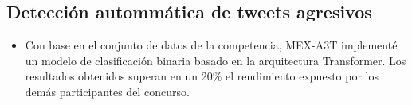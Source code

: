 \documentclass[a3paper]{adcv_color}
\begin{document}
\begin{addmargin}[0.5em]{0.5em}
	\subsection{Detección autommática de tweets agresivos}
	\begin{itemize}
		\item Con base en el conjunto de datos de la competencia, MEX-A3T implementé un modelo de clasificación binaria basado en la arquitectura Transformer. Los resultados obtenidos superan en un 20\% el rendimiento expuesto por los demás participantes del concurso.
	\end{itemize}




\end{addmargin}
\end{document}
